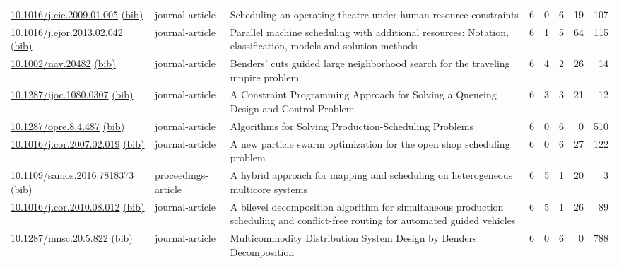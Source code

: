 {\begin{longtable}{p{5cm}lp{11cm}rrrrr}
\href{http://dx.doi.org/10.1016/j.cie.2009.01.005}{10.1016/j.cie.2009.01.005} \href{https://www.doi2bib.org/bib/10.1016/j.cie.2009.01.005}{(bib)} & journal-article & Scheduling an operating theatre under human resource constraints & 6 & 0 & 6 & 19 & 107 \\
\href{http://dx.doi.org/10.1016/j.ejor.2013.02.042}{10.1016/j.ejor.2013.02.042} \href{https://www.doi2bib.org/bib/10.1016/j.ejor.2013.02.042}{(bib)} & journal-article & Parallel machine scheduling with additional resources: Notation, classification, models and solution methods & 6 & 1 & 5 & 64 & 115 \\
\href{http://dx.doi.org/10.1002/nav.20482}{10.1002/nav.20482} \href{https://www.doi2bib.org/bib/10.1002/nav.20482}{(bib)} & journal-article & Benders' cuts guided large neighborhood search for the traveling umpire problem & 6 & 4 & 2 & 26 & 14 \\
\href{http://dx.doi.org/10.1287/ijoc.1080.0307}{10.1287/ijoc.1080.0307} \href{https://www.doi2bib.org/bib/10.1287/ijoc.1080.0307}{(bib)} & journal-article & A Constraint Programming Approach for Solving a Queueing Design and Control Problem & 6 & 3 & 3 & 21 & 12 \\
\href{http://dx.doi.org/10.1287/opre.8.4.487}{10.1287/opre.8.4.487} \href{https://www.doi2bib.org/bib/10.1287/opre.8.4.487}{(bib)} & journal-article & Algorithms for Solving Production-Scheduling Problems & 6 & 0 & 6 & 0 & 510 \\
\href{http://dx.doi.org/10.1016/j.cor.2007.02.019}{10.1016/j.cor.2007.02.019} \href{https://www.doi2bib.org/bib/10.1016/j.cor.2007.02.019}{(bib)} & journal-article & A new particle swarm optimization for the open shop scheduling problem & 6 & 0 & 6 & 27 & 122 \\
\href{http://dx.doi.org/10.1109/samos.2016.7818373}{10.1109/samos.2016.7818373} \href{https://www.doi2bib.org/bib/10.1109/samos.2016.7818373}{(bib)} & proceedings-article & A hybrid approach for mapping and scheduling on heterogeneous multicore systems & 6 & 5 & 1 & 20 & 3 \\
\href{http://dx.doi.org/10.1016/j.cor.2010.08.012}{10.1016/j.cor.2010.08.012} \href{https://www.doi2bib.org/bib/10.1016/j.cor.2010.08.012}{(bib)} & journal-article & A bilevel decomposition algorithm for simultaneous production scheduling and conflict-free routing for automated guided vehicles & 6 & 5 & 1 & 26 & 89 \\
\href{http://dx.doi.org/10.1287/mnsc.20.5.822}{10.1287/mnsc.20.5.822} \href{https://www.doi2bib.org/bib/10.1287/mnsc.20.5.822}{(bib)} & journal-article & Multicommodity Distribution System Design by Benders Decomposition & 6 & 0 & 6 & 0 & 788 \\

\end{longtable}}
